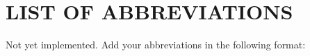 \clearpage
{}
\chapter*{\centering LIST OF ABBREVIATIONS}

Not yet implemented. Add your abbreviations in the following format:


